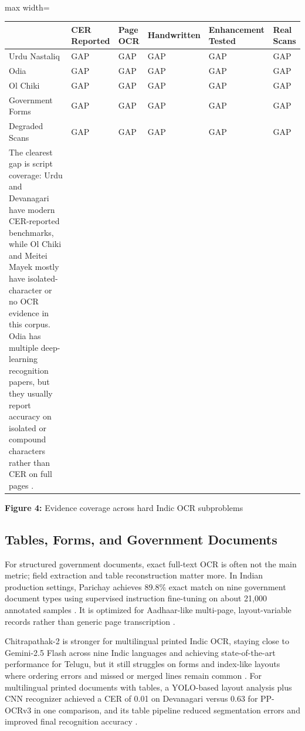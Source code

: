     
    \mbox{}\\
    \begin{adjustbox}{max width=\textwidth}
    \begin{tabular}{p{2.7cm} | p{2.7cm} | p{2.7cm} | p{2.7cm} | p{2.7cm} | p{2.7cm}}
    \hline
     & CER Reported & Page OCR & Handwritten & Enhancement Tested & Real Scans \\
    \hline
    Urdu Nastaliq & GAP & GAP & GAP & GAP & GAP \\
    Odia & GAP & GAP & GAP & GAP & GAP \\
    Ol Chiki & GAP & GAP & GAP & GAP & GAP \\
    Government Forms & GAP & GAP & GAP & GAP & GAP \\
    Degraded Scans & GAP & GAP & GAP & GAP & GAP \\
    The clearest gap is script coverage: Urdu and Devanagari have modern CER-reported benchmarks, while Ol Chiki and Meitei Mayek mostly have isolated-character or no OCR evidence in this corpus. Odia has multiple deep-learning recognition papers, but they usually report accuracy on isolated or compound characters rather than CER on full pages  \cite{Dey2022Offline} \cite{Sahoo2026Handwritten} \cite{Panda2022CNN}. \\
    \hline
    \end{tabular}
    \end{adjustbox}
    
    
    \textbf{Figure 4:} Evidence coverage across hard Indic OCR subproblems
    
    
    \subsection*{Tables, Forms, and Government Documents}
    
    
    For structured government documents, exact full-text OCR is often not the main metric; field extraction and table reconstruction matter more. In Indian production settings, Parichay achieves 89.8\% exact match on nine government document types using supervised instruction fine-tuning on about 21,000 annotated samples  \cite{Faraz2026Designing}. It is optimized for Aadhaar-like multi-page, layout-variable records rather than generic page transcription  \cite{Faraz2026Designing}.
    
    
    Chitrapathak-2 is stronger for multilingual printed Indic OCR, staying close to Gemini-2.5 Flash across nine Indic languages and achieving state-of-the-art performance for Telugu, but it still struggles on forms and index-like layouts where ordering errors and missed or merged lines remain common  \cite{Faraz2026Designing}. For multilingual printed documents with tables, a YOLO-based layout analysis plus CNN recognizer achieved a CER of 0.01 on Devanagari versus 0.63 for PP-OCRv3 in one comparison, and its table pipeline reduced segmentation errors and improved final recognition accuracy  \cite{Li2025Printed}.
    
